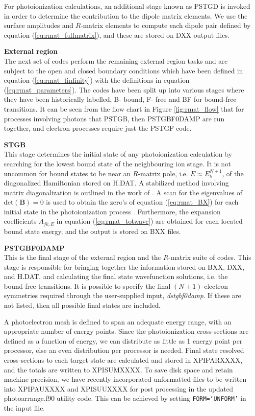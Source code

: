 For photoionization calculations, an additional stage known as PSTGD is invoked in order to determine the contribution to the dipole matrix elements. We use the surface amplitudes and $R$-matrix elements to compute each dipole pair defined by equation (\ref{eq:rmat_fullmatrix}), and these are stored on DXX output files.

\protect\textbf{External region}\\
The next set of codes perform the remaining external region tasks and are subject to the open and closed boundary conditions which have been defined in equation (\ref{eq:rmat_finfinity}) with the definitions in equation (\ref{eq:rmat_parameters}). The codes have been split up into various stages where they have been historically labelled, B- bound, F- free and BF for bound-free transitions. It can be seen from the flow chart in Figure \ref{fig:rmat_flow} that for processes involving photons that PSTGB, then PSTGBF0DAMP are run together, and electron processes require just the PSTGF code.

\protect\textbf{STGB}\\
This stage determines the initial state of any photoionization calculation by searching for the lowest bound state of the neighbouring ion stage. It is not uncommon for bound states to be near an $R$-matrix pole, i.e. $E \approx E_k^{N+1}$, of the diagonalized Hamiltonian stored on H.DAT. A stabilized method involving matrix diagonalization is outlined in the work of \citet{1984JPhB...17L.683B}. A scan for the eigenvalues of det$(\boldsymbol{B}) = 0$ is used to obtain the zero's of equation (\ref{eq:rmat_BX}) for each initial state in the photoionization process \citep{1985JPhB...18.2111S}. Furthermore, the expansion coefficients $A_{jk,E}$ in equation (\ref{eq:rmat_totwave}) are obtained for each located bound state energy, and the output is stored on BXX files.

\protect\textbf{PSTGBF0DAMP}\\
This is the final stage of the external region and the $R$-matrix suite of codes. This stage is responsible for bringing together the information stored on BXX, DXX, and H.DAT, and calculating the final state wavefunction solutions, i.e. the bound-free transitions. It is possible to specify the final $(N+1)$-electron symmetries required through the user-supplied input, \textit{dstgbf0damp}. If these are not listed, then all possible final states are included.

A photoelectron mesh is defined to span an adequate energy range, with an appropriate number of energy points. Since the photoionization cross-sections are defined as a function of energy, we can distribute as little as 1 energy point per processor, else an even distribution per processor is needed. Final state resolved cross-sections to each target state are calculated and stored in XPIPARXXXX, and the totals are written to XPISUMXXXX. To save disk space and retain machine precision, we have recently incorporated unformatted files to be written into XPIPAUXXXX and XPISUUXXXX for post processing in the updated {\sc photoarrange.f90} utility code. This can be achieved by setting {\tt FORM=`UNFORM'} in the input file.

